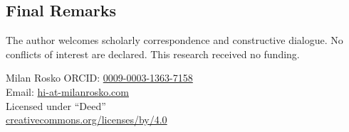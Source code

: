 \documentclass[letterpaper,10pt]{article}
\theoremstyle{upright}
\theoremstyle{upright}
\begin{document}
\subsection*{Final Remarks}

	The author welcomes scholarly correspondence and constructive dialogue. No conflicts of interest are declared. This research received no funding.

\begin{center}
	\scriptsize{
	\vspace{3em}
	Milan Rosko
	\vspace{1em}
	ORCID: \href{https://orcid.org/0009-0003-1363-7158}{\textsf{0009-0003-1363-7158}}\\
	Email: \href{mailto:hi-at-milanrosko.com}{\textsf{hi-at-milanrosko.com}}\\
	\vspace{1em}
	Licensed under \enquote{Deed} \ccby \\ \href{http://creativecommons.org/licenses/by/4.0/}{\scriptsize\textsf{creativecommons.org/licenses/by/4.0}}
	}
\end{center}

\vspace*{\fill}
\end{document}
